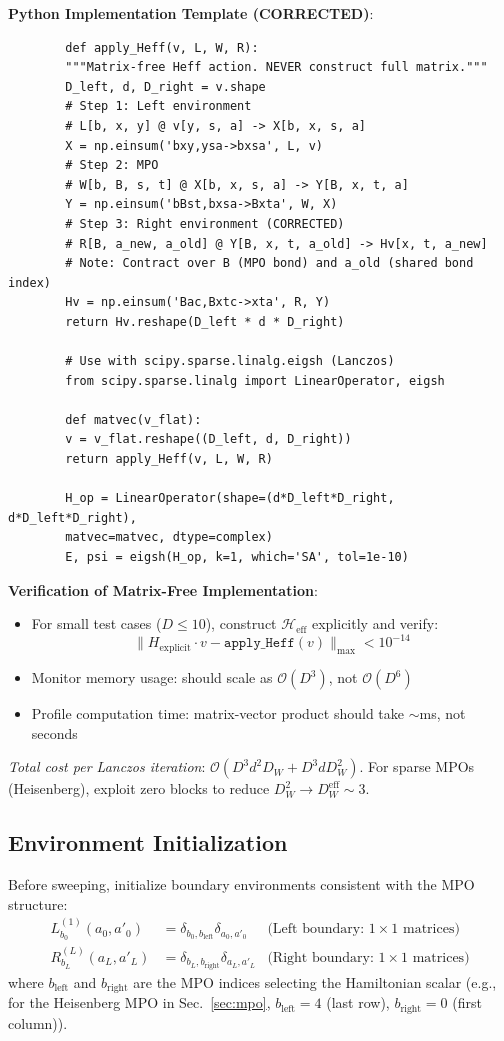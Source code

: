 \documentclass[aps,prb,onecolumn,scriptaddress]{revtex4-2}
\newcommand{\Order}{\mathcal{O}}
\begin{document}
	\textbf{Python Implementation Template (CORRECTED)}:
	\begin{verbatim}
		def apply_Heff(v, L, W, R):
		"""Matrix-free Heff action. NEVER construct full matrix."""
		D_left, d, D_right = v.shape
		# Step 1: Left environment
		# L[b, x, y] @ v[y, s, a] -> X[b, x, s, a]
		X = np.einsum('bxy,ysa->bxsa', L, v)
		# Step 2: MPO
		# W[b, B, s, t] @ X[b, x, s, a] -> Y[B, x, t, a]
		Y = np.einsum('bBst,bxsa->Bxta', W, X)
		# Step 3: Right environment (CORRECTED)
		# R[B, a_new, a_old] @ Y[B, x, t, a_old] -> Hv[x, t, a_new]
		# Note: Contract over B (MPO bond) and a_old (shared bond index)
		Hv = np.einsum('Bac,Bxtc->xta', R, Y)
		return Hv.reshape(D_left * d * D_right)
		
		# Use with scipy.sparse.linalg.eigsh (Lanczos)
		from scipy.sparse.linalg import LinearOperator, eigsh
		
		def matvec(v_flat):
		v = v_flat.reshape((D_left, d, D_right))
		return apply_Heff(v, L, W, R)
		
		H_op = LinearOperator(shape=(d*D_left*D_right, d*D_left*D_right),
		matvec=matvec, dtype=complex)
		E, psi = eigsh(H_op, k=1, which='SA', tol=1e-10)
	\end{verbatim}
	
	\textbf{Verification of Matrix-Free Implementation}:
	\begin{itemize}
		\item For small test cases ($D \leq 10$), construct $\mathcal{H}_{\text{eff}}$ explicitly and verify:
		\begin{equation}
			\|H_{\text{explicit}} \cdot v - \texttt{apply\_Heff}(v)\|_{\max} < 10^{-14}
		\end{equation}
		\item Monitor memory usage: should scale as $\Order(D^3)$, not $\Order(D^6)$
		\item Profile computation time: matrix-vector product should take $\sim$ms, not seconds
	\end{itemize}
	
	\textit{Total cost per Lanczos iteration}: $\Order(D^3 d^2 D_W + D^3 d D_W^2)$. For sparse MPOs (Heisenberg), exploit zero blocks to reduce $D_W^2 \to D_W^{\text{eff}} \sim 3$.
	
	
	\subsection{Environment Initialization}
	Before sweeping, initialize boundary environments consistent with the MPO structure:
	\begin{align}
		L^{(1)}_{b_0}(a_0, a'_0) &= \delta_{b_0, b_{\text{left}}} \delta_{a_0, a'_0} & \text{(Left boundary: $1 \times 1$ matrices)} \\
		R^{(L)}_{b_L}(a_L, a'_L) &= \delta_{b_L, b_{\text{right}}} \delta_{a_L, a'_L} & \text{(Right boundary: $1 \times 1$ matrices)}
	\end{align}
	where $b_{\text{left}}$ and $b_{\text{right}}$ are the MPO indices selecting the Hamiltonian scalar (e.g., for the Heisenberg MPO in Sec.~\ref{sec:mpo}, $b_{\text{left}}=4$ (last row), $b_{\text{right}}=0$ (first column)).
	
\end{document}
